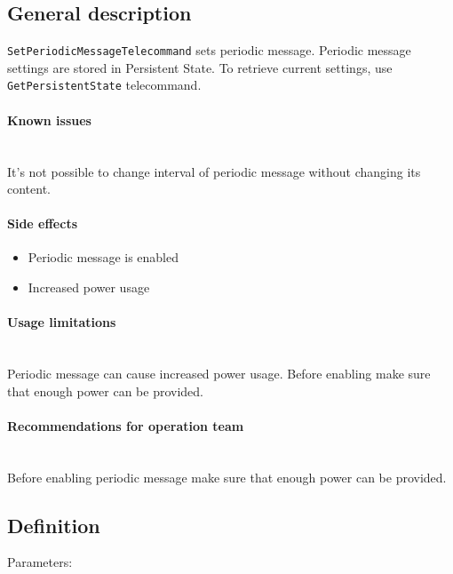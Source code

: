 

\subsection{General description}
\texttt{SetPeriodicMessageTelecommand} sets periodic message. Periodic message settings are stored in Persistent State. To retrieve current settings, use \texttt{GetPersistentState} telecommand. 

\paragraph{Known issues} \mbox{} \\
It's not possible to change interval of periodic message without changing its content.

\paragraph{Side effects}
\begin{itemize}
	\item Periodic message is enabled
	\item Increased power usage
\end{itemize}

\paragraph{Usage limitations} \mbox{} \\
Periodic message can cause increased power usage. Before enabling make sure that enough power can be provided.

\paragraph{Recommendations for operation team} \mbox{} \\
Before enabling periodic message make sure that enough power can be provided.

\subsection{Definition}

Parameters:

\begin{tcarglist}
\end{tcarglist}


